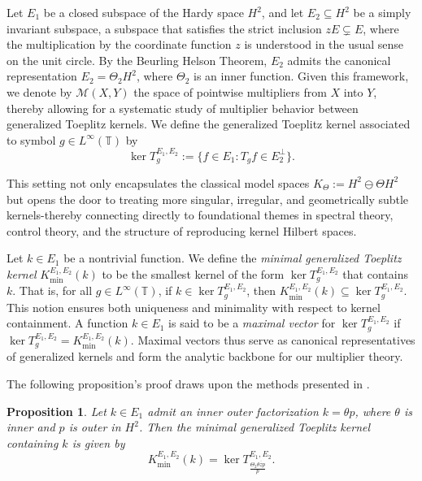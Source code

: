 \documentclass[12pt,a4paper]{amsart}
\newtheorem{Proposition}[Definition]{Proposition}
\begin{document}
\smallskip

Let \( E_1 \) be a closed subspace of the Hardy space \( H^2 \), and let \( E_2 \subseteq H^2 \) be a simply invariant subspace, a subspace that satisfies the strict inclusion $zE\subsetneq E$, where the multiplication by the coordinate function $z$ is understood in the usual sense on the unit circle. By the Beurling Helson Theorem, \( E_2 \) admits the canonical representation \( E_2 = \Theta_2 H^2 \), where \( \Theta_2 \) is an inner function. Given this framework, we denote by \( \mathcal{M}(X, Y) \) the space of pointwise multipliers from \( X \) into \( Y \), thereby allowing for a systematic study of multiplier behavior between generalized Toeplitz kernels.  We define the generalized Toeplitz kernel associated to symbol $g \in L^\infty(\mathbb{T})$ by
\[
\ker T_g^{E_1, E_2} := \{ f \in E_1 : T_g f \in E_2^\perp \} .\]


This setting not only encapsulates the classical model spaces $K_\Theta := H^2 \ominus \Theta H^2$ but opens the door to treating more singular, irregular, and geometrically subtle kernels-thereby connecting directly to foundational themes in spectral theory, control theory, and the structure of reproducing kernel Hilbert spaces.
\smallskip

Let \( k \in E_1 \) be a nontrivial function. We define the \emph{minimal generalized Toeplitz kernel} \( K_{\text{min}}^{E_1, E_2}(k) \) to be the smallest kernel of the form \( \ker T_g^{E_1, E_2} \) that contains \( k \). That is, for all \( g \in L^\infty(\mathbb{T}) \), if \( k \in \ker T_g^{E_1, E_2} \), then \( K_{\text{min}}^{E_1, E_2}(k) \subseteq \ker T_g^{E_1, E_2} \). This notion ensures both uniqueness and minimality with respect to kernel containment. A function \( k \in E_1 \) is said to be a \emph{maximal vector} for \( \ker T_g^{E_1, E_2} \) if \( \ker T_g^{E_1, E_2} = K_{\text{min}}^{E_1, E_2}(k) \). Maximal vectors thus serve as canonical representatives of generalized kernels and form the analytic backbone for our multiplier theory.

 The following proposition's proof draws upon the methods presented in \cite{camara2018multipliers}.

\begin{Proposition}\label{thm40}
Let \( k \in E_1 \) admit an inner outer factorization \( k = \theta p \), where \( \theta \) is inner and \( p \) is outer in \( H^2 \). Then the minimal generalized Toeplitz kernel containing \( k \) is given by
\[
K_{\min}^{E_1, E_2}(k) = \ker T_{\frac{\Theta_2 \overline{\theta zp}}{p}}^{E_1, E_2}.
\]
\end{Proposition}
\end{document}
